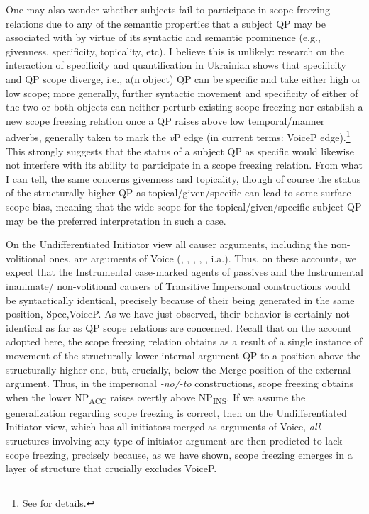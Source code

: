 \documentclass[output=paper,colorlinks,citecolor=brown]{langscibook}
\begin{document}
One may also wonder whether subjects fail to participate in scope freezing relations due to any of the semantic properties that a subject QP may be associated with by virtue of its syntactic and semantic prominence (e.g., givenness, specificity, topicality, etc). I believe this is unlikely: research on the interaction of specificity and quantification in Ukrainian shows that specificity and QP scope diverge, i.e., a(n object) QP can be specific and take either high or low scope; more generally, further syntactic movement and specificity of either of the two or both objects can neither perturb existing scope freezing nor establish a new scope freezing relation once a QP raises above low temporal/manner adverbs, generally taken to mark the \textit{v}P edge (in current terms: VoiceP edge).\footnote{\textrm{See \citet{AntonyukMykhaylyk2022} for details.}} This strongly suggests that the status of a subject QP as specific would likewise not interfere with its ability to participate in a scope freezing relation. From what I can tell, the same concerns givenness and topicality, though of course the status of the structurally higher QP as topical/given/specific can lead to some surface scope bias, meaning that the wide scope for the topical/given/specific subject QP may be the preferred interpretation in such a case.



On the Undifferentiated Initiator view all causer arguments, including the non-volitional ones, are arguments of Voice (\citealt{Kallulli2006}, \citealt{ant:Ramchand2008}, \citealt{Bruening2013}, \citealt{Legate2014}, \citealt{Wood2017}, i.a.). Thus, on these accounts, we expect that the Instrumental case-marked agents of passives and the Instrumental inanimate/ non-volitional causers of Transitive Impersonal constructions would be syntactically identical, precisely because of their being generated in the same position, Spec,VoiceP. As we have just observed, their behavior is certainly not identical as far as QP scope relations are concerned. Recall that on the account adopted here, the scope freezing relation obtains as a result of a single instance of movement of the structurally lower internal argument QP to a position above the structurally higher one, but, crucially, below the Merge position of the external argument. Thus, in the impersonal \textit{{}-no/-to} constructions, scope freezing obtains when the lower NP\textsubscript{ACC} raises overtly above NP\textsubscript{INS}. If we assume the generalization regarding scope freezing is correct, then on the Undifferentiated Initiator view, which has all initiators merged as arguments of Voice, \textit{all} structures involving any type of initiator argument are then predicted to lack scope freezing, precisely because, as we have shown, scope freezing emerges in a layer of structure that crucially excludes VoiceP. 
\end{document}

